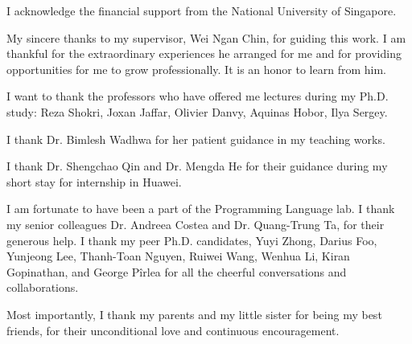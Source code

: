 \begin{acknowledgments}


I acknowledge the financial support from the National University of Singapore.

My sincere thanks to my supervisor, Wei Ngan Chin, for guiding this work. 
I am thankful for the extraordinary experiences he arranged for me and for 
providing opportunities for me to grow professionally. 
It is an honor to learn from him.

I want to thank the professors who have offered me lectures 
during my Ph.D. study: Reza Shokri, Joxan Jaffar, Olivier Danvy, Aquinas Hobor, Ilya Sergey. 

I thank Dr. Bimlesh Wadhwa for her patient guidance in my teaching works. 

I thank Dr. Shengchao Qin and Dr. Mengda He for their guidance during my short stay for 
internship in Huawei. 



I am fortunate to have been a part of the Programming Language lab. 
I thank my senior colleagues Dr. Andreea Costea and Dr. Quang-Trung Ta, for 
their generous help. 
I thank my peer Ph.D. candidates, Yuyi Zhong, Darius Foo, Yunjeong Lee, 
Thanh-Toan Nguyen, Ruiwei Wang, Wenhua Li, Kiran Gopinathan, and George Pîrlea for 
all the cheerful conversations and collaborations. 



Most importantly, I thank my parents and my little sister for being my best 
friends, for their unconditional love and continuous encouragement.

\end{acknowledgments}
